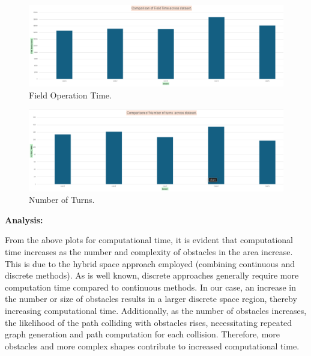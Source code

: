 \begin{figure}[H]
    \centering
    \includegraphics[width=\textwidth]{Images/plots/obs/Field time.png}
    \caption{Field Operation Time.}
    \label{fig:Field_operation_time_obs}
\end{figure}

\begin{figure}[H]
    \centering
    \includegraphics[width=\textwidth]{Images/plots/obs/Number of turns.png}
    \caption{Number of Turns.}
    \label{fig:number_of_turns_obs}
\end{figure}


\textbf{Analysis: }

From the above plots for computational time, it is evident that computational time increases as the number and complexity of obstacles in the area increase. This is due to the hybrid space approach employed (combining continuous and discrete methods). As is well known, discrete approaches generally require more computation time compared to continuous methods. In our case, an increase in the number or size of obstacles results in a larger discrete space region, thereby increasing computational time. Additionally, as the number of obstacles increases, the likelihood of the path colliding with obstacles rises, necessitating repeated graph generation and path computation for each collision. Therefore, more obstacles and more complex shapes contribute to increased computational time.


\vspace*{6mm}

